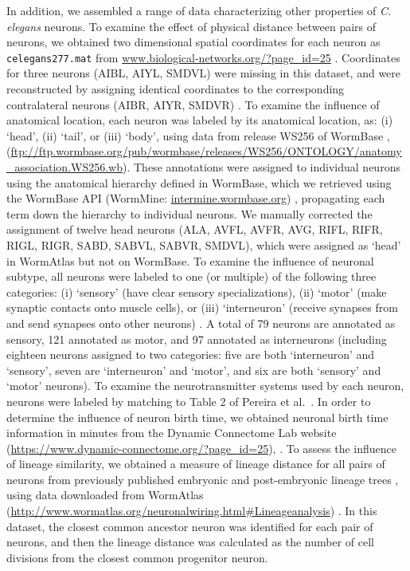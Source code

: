 \documentclass[10pt,letterpaper]{article}
\begin{document}
In addition, we assembled a range of data characterizing other properties of \emph{C. elegans} neurons.
To examine the effect of physical distance between pairs of neurons, we obtained two dimensional spatial coordinates for each neuron as \texttt{celegans277.mat} from \url{www.biological-networks.org/?page_id=25} \cite{choe2004network}.
Coordinates for three neurons (AIBL, AIYL, SMDVL) were missing in this dataset, and were reconstructed by assigning identical coordinates to the corresponding contralateral neurons (AIBR, AIYR, SMDVR) \cite{Varier2011}.
To examine the influence of anatomical location, each neuron was labeled by its anatomical location, as:
(i) `head', (ii) `tail', or (iii) `body', using data from release WS256 of WormBase \cite{Harris:2009kd}, (\url{ftp://ftp.wormbase.org/pub/wormbase/releases/WS256/ONTOLOGY/anatomy_association.WS256.wb}).
These annotations were assigned to individual neurons using the anatomical hierarchy defined in WormBase, which we retrieved using the WormBase API (WormMine: \url{intermine.wormbase.org}) \cite{Harris:2009kd}, propagating each term down the hierarchy to individual neurons.
We manually corrected the assignment of twelve head neurons (ALA, AVFL, AVFR, AVG, RIFL, RIFR, RIGL, RIGR, SABD, SABVL, SABVR, SMDVL), which were assigned as `head' in WormAtlas \cite{WormAtlas} but not on WormBase.
To examine the influence of neuronal subtype, all neurons were labeled to one (or multiple) of the following three categories:
(i) `sensory' (have clear sensory specializations),
(ii) `motor' (make synaptic contacts onto muscle cells), or
(iii) `interneuron' (receive synapses from and send synapses onto other neurons) \cite{White:1986tx}.
A total of 79 neurons are annotated as sensory, 121 annotated as motor, and 97 annotated as interneurons (including eighteen neurons assigned to two categories: five are both `interneuron' and `sensory', seven are `interneuron' and `motor', and six are both `sensory' and `motor' neurons).
To examine the neurotransmitter systems used by each neuron, neurons were labeled by matching to Table 2 of Pereira et al.~\cite{Pereira:2015er}.
In order to determine the influence of neuron birth time, we obtained neuronal birth time information in minutes from the Dynamic Connectome Lab website (\url{https://www.dynamic-connectome.org/?page_id=25}), \cite{Varier2011}.
To assess the influence of lineage similarity, we obtained a measure of lineage distance for all pairs of neurons from previously published embryonic and post-embryonic lineage trees \cite{Sulston1977, Sulston1983}, using data downloaded from WormAtlas (\url{http://www.wormatlas.org/neuronalwiring.html#Lineageanalysis}) \cite{WormAtlas}.
In this dataset, the closest common ancestor neuron was identified for each pair of neurons, and then the lineage distance was calculated as the number of cell divisions from the closest common progenitor neuron.
\end{document}
